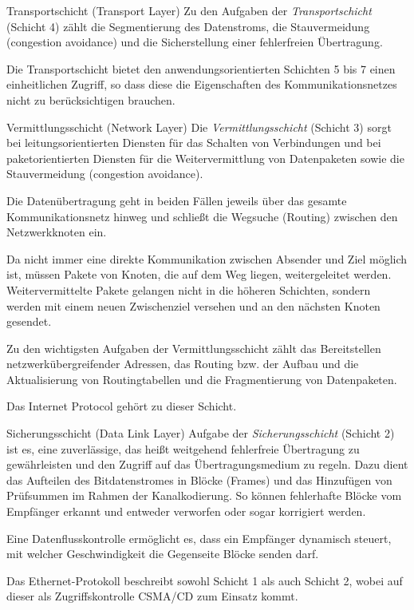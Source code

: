 \begin{defi}{Transportschicht (Transport Layer)}
    Zu den Aufgaben der \emph{Transportschicht} (Schicht 4) zählt die Segmentierung des Datenstroms, die Stauvermeidung (congestion avoidance) und die Sicherstellung einer fehlerfreien Übertragung.

    Die Transportschicht bietet den anwendungsorientierten Schichten 5 bis 7 einen einheitlichen Zugriff, so dass diese die Eigenschaften des Kommunikationsnetzes nicht zu berücksichtigen brauchen.
\end{defi}

\begin{defi}{Vermittlungsschicht (Network Layer)}
    Die \emph{Vermittlungsschicht} (Schicht 3) sorgt bei leitungsorientierten Diensten für das Schalten von Verbindungen und bei paketorientierten Diensten für die Weitervermittlung von Datenpaketen sowie die Stauvermeidung (congestion avoidance).

    Die Datenübertragung geht in beiden Fällen jeweils über das gesamte Kommunikationsnetz hinweg und schließt die Wegsuche (Routing) zwischen den Netzwerkknoten ein.

    Da nicht immer eine direkte Kommunikation zwischen Absender und Ziel möglich ist, müssen Pakete von Knoten, die auf dem Weg liegen, weitergeleitet werden.
    Weitervermittelte Pakete gelangen nicht in die höheren Schichten, sondern werden mit einem neuen Zwischenziel versehen und an den nächsten Knoten gesendet.

    Zu den wichtigsten Aufgaben der Vermittlungsschicht zählt das Bereitstellen netzwerkübergreifender Adressen, das Routing bzw. der Aufbau und die Aktualisierung von Routingtabellen und die Fragmentierung von Datenpaketen.

    Das Internet Protocol gehört zu dieser Schicht.
\end{defi}

\begin{defi}{Sicherungsschicht (Data Link Layer)}
    Aufgabe der \emph{Sicherungsschicht} (Schicht 2) ist es, eine zuverlässige, das heißt weitgehend fehlerfreie Übertragung zu gewährleisten und den Zugriff auf das Übertragungsmedium zu regeln. Dazu dient das Aufteilen des Bitdatenstromes in Blöcke (Frames) und das Hinzufügen von Prüfsummen im Rahmen der Kanalkodierung.
    So können fehlerhafte Blöcke vom Empfänger erkannt und entweder verworfen oder sogar korrigiert werden.

    Eine Datenflusskontrolle ermöglicht es, dass ein Empfänger dynamisch steuert, mit welcher Geschwindigkeit die Gegenseite Blöcke senden darf.

    Das Ethernet-Protokoll beschreibt sowohl Schicht 1 als auch Schicht 2, wobei auf dieser als Zugriffskontrolle CSMA/CD zum Einsatz kommt.
\end{defi}

